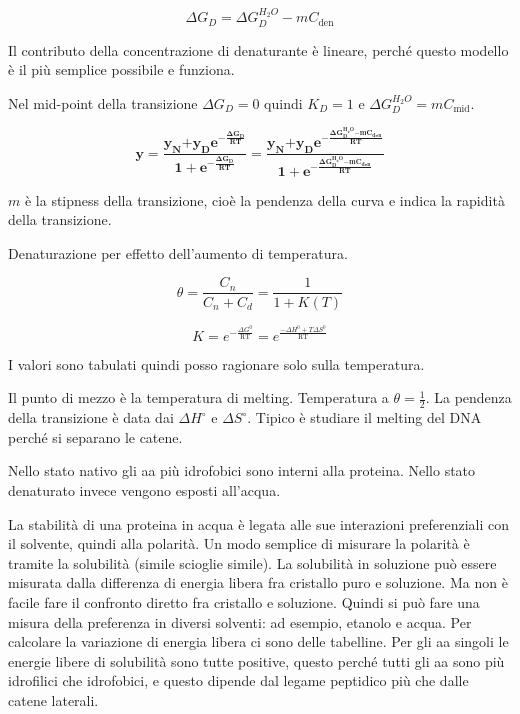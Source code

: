 \[\Delta G_{D} = \Delta G_{D}^{H_{2}O} - mC_{\text{den}}\]

Il contributo della concentrazione di denaturante è lineare, perché
questo modello è il più semplice possibile e funziona.

Nel mid-point della transizione \(\Delta G_{D} = 0\) quindi
\(K_{D} = 1\) e \(\Delta G_{D}^{H_{2}O} = mC_{\text{mid}}\).

\[\mathbf{y =}\frac{\mathbf{y}_{\mathbf{N}}\mathbf{+}\mathbf{y}_{\mathbf{D}}\mathbf{e}^{\mathbf{-}\frac{\mathbf{\Delta}\mathbf{G}_{\mathbf{D}}}{\mathbf{\text{RT}}}}}{\mathbf{1 +}\mathbf{e}^{\mathbf{-}\frac{\mathbf{\Delta}\mathbf{G}_{\mathbf{D}}}{\mathbf{\text{RT}}}}}\mathbf{=}\frac{\mathbf{y}_{\mathbf{N}}\mathbf{+}\mathbf{y}_{\mathbf{D}}\mathbf{e}^{\mathbf{-}\frac{\mathbf{\Delta}\mathbf{G}_{\mathbf{D}}^{\mathbf{H}_{\mathbf{2}}\mathbf{O}}\mathbf{- m}\mathbf{C}_{\mathbf{\text{den}}}}{\mathbf{\text{RT}}}}}{\mathbf{1 +}\mathbf{e}^{\mathbf{-}\frac{\mathbf{\Delta}\mathbf{G}_{\mathbf{D}}^{\mathbf{H}_{\mathbf{2}}\mathbf{O}}\mathbf{- m}\mathbf{C}_{\mathbf{\text{den}}}}{\mathbf{\text{RT}}}}}\]

\(m\) è la stipness della transizione, cioè la pendenza della curva e
indica la rapidità della transizione.

Denaturazione per effetto dell'aumento di temperatura.

\[\theta = \frac{C_{n}}{C_{n} + C_{d}} = \frac{1}{1 + K\left( T \right)}\]

\[K = e^{- \frac{\Delta G^{0}}{\text{RT}}} = e^{\frac{- \Delta H^{0} + T\Delta S^{0}}{\text{RT}}}\]

I valori sono tabulati quindi posso ragionare solo sulla temperatura.

Il punto di mezzo è la temperatura di melting. Temperatura a
\(\theta = \frac{1}{2}\). La pendenza della transizione è data dai
\(\Delta H^{\circ}\) e \(\Delta S^{\circ}\). Tipico è studiare il
melting del DNA perché si separano le catene.

Nello stato nativo gli aa più idrofobici sono interni alla proteina.
Nello stato denaturato invece vengono esposti all'acqua.

La stabilità di una proteina in acqua è legata alle sue interazioni
preferenziali con il solvente, quindi alla polarità. Un modo semplice di
misurare la polarità è tramite la solubilità (simile scioglie simile).
La solubilità in soluzione può essere misurata dalla differenza di
energia libera fra cristallo puro e soluzione. Ma non è facile fare il
confronto diretto fra cristallo e soluzione. Quindi si può fare una
misura della preferenza in diversi solventi: ad esempio, etanolo e
acqua. Per calcolare la variazione di energia libera ci sono delle
tabelline. Per gli aa singoli le energie libere di solubilità sono tutte
positive, questo perché tutti gli aa sono più idrofilici che idrofobici,
e questo dipende dal legame peptidico più che dalle catene laterali.

